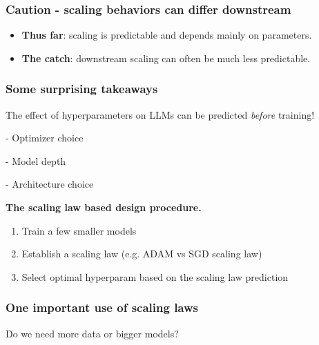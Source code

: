 \documentclass[12pt,twoside]{article}
\begin{document}
\subsubsection*{Caution - scaling behaviors can differ downstream}

\begin{itemize}
    \item \textbf{Thus far}: scaling is predictable and depends mainly on parameters.
    \item \textbf{The catch}: downstream scaling can often be much less predictable.
\end{itemize}

\subsubsection*{Some surprising takeaways}

\begin{center}
    The effect of hyperparameters on LLMs can be predicted \textit{before} training!
\end{center}

\begin{center}
    - Optimizer choice
\end{center}

\begin{center}
    - Model depth
\end{center}

\begin{center}
    - Architecture choice
\end{center}

\begin{center}
    \textbf{The scaling law based design procedure.}
\end{center}

\begin{enumerate}
    \item Train a few smaller models
    \item Establish a scaling law (e.g. ADAM vs SGD scaling law)
    \item Select optimal hyperparam based on the scaling law prediction
\end{enumerate}

\subsubsection*{One important use of scaling laws}

\begin{question}
    Do we need more data or bigger models?
\end{question}
\end{document}
